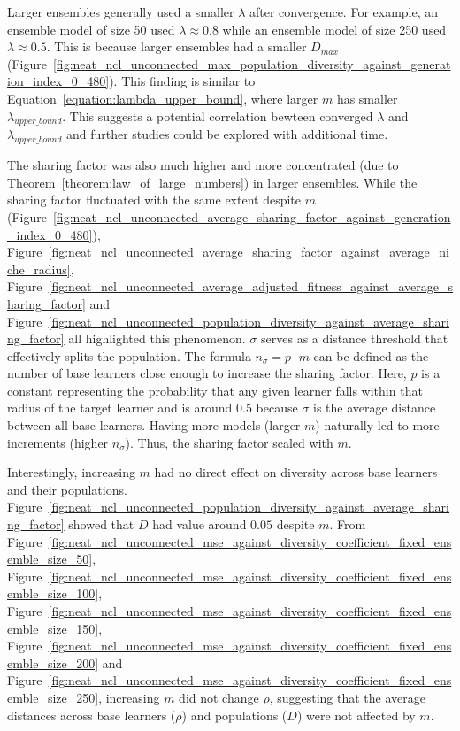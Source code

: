 Larger ensembles generally used a smaller $\lambda$ after convergence. For example, an ensemble model of size 50 used $\lambda \approx 0.8$ while an ensemble model of size 250 used $\lambda \approx 0.5$. This is because larger ensembles had a smaller $D_{max}$ (Figure~\ref{fig:neat_ncl_unconnected_max_population_diversity_against_generation_index_0_480}). This finding is similar to Equation~\ref{equation:lambda_upper_bound}, where larger $m$ has smaller $\lambda_{upper\_bound}$. This suggests a potential correlation bewteen converged $\lambda$ and $\lambda_{upper\_bound}$ and further studies could be explored with additional time. 

The sharing factor was also much higher and more concentrated (due to Theorem~\ref{theorem:law_of_large_numbers}) in larger ensembles. While the sharing factor fluctuated with the same extent despite $m$ (Figure~\ref{fig:neat_ncl_unconnected_average_sharing_factor_against_generation_index_0_480}), Figure~\ref{fig:neat_ncl_unconnected_average_sharing_factor_against_average_niche_radius}, Figure~\ref{fig:neat_ncl_unconnected_average_adjusted_fitness_against_average_sharing_factor} and Figure~\ref{fig:neat_ncl_unconnected_population_diversity_against_average_sharing_factor} all highlighted this phenomenon. $\sigma$ serves as a distance threshold that effectively splits the population. The formula $n_{\sigma} = p \cdot m$ can be defined as the number of base learners close enough to increase the sharing factor. Here, $p$ is a constant representing the probability that any given learner falls within that radius of the target learner and is around $0.5$ because $\sigma$ is the average distance between all base learners. Having more models (larger $m$) naturally led to more increments (higher $n_{\sigma}$). Thus, the sharing factor scaled with $m$. 

Interestingly, increasing $m$ had no direct effect on diversity across base learners and their populations. Figure~\ref{fig:neat_ncl_unconnected_population_diversity_against_average_sharing_factor} showed that $D$ had value around $0.05$ despite $m$. From Figure~\ref{fig:neat_ncl_unconnected_mse_against_diversity_coefficient_fixed_ensemble_size_50}, Figure~\ref{fig:neat_ncl_unconnected_mse_against_diversity_coefficient_fixed_ensemble_size_100}, Figure~\ref{fig:neat_ncl_unconnected_mse_against_diversity_coefficient_fixed_ensemble_size_150}, Figure~\ref{fig:neat_ncl_unconnected_mse_against_diversity_coefficient_fixed_ensemble_size_200} and Figure~\ref{fig:neat_ncl_unconnected_mse_against_diversity_coefficient_fixed_ensemble_size_250}, increasing $m$ did not change $\rho$, suggesting that the average distances across base learners ($\rho$) and populations ($D$) were not affected by $m$. 

